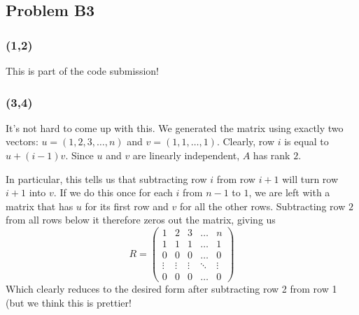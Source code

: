 \documentclass{article}
\begin{document}
\subsection{Problem B3}
\subsubsection{(1,2)} This is part of the code submission!
\subsubsection{(3,4)}
It's not hard to come up with this. We generated the matrix using exactly two vectors:
$u = (1,2,3,\dots,n)$ and $v = (1,1,\dots,1)$. Clearly, row $i$ is equal to $u + (i-1)v$.
Since $u$ and $v$ are linearly independent, $A$ has rank $2$.

In particular, this tells us that subtracting row $i$ from row $i+1$ will turn row $i+1$ into $v$.
If we do this once for each $i$ from $n-1$ to $1$, we are left with a matrix that has $u$
for its first row and $v$ for all the other rows.
Subtracting row $2$ from all rows below it therefore zeros out the matrix, giving us
\[
R = \left(
\begin{array}{ccccc}
1 & 2 & 3 & \dots & n\\
1 & 1 & 1 & \dots & 1\\
0 & 0 & 0 & \dots & 0\\
\vdots & \vdots & \vdots & \ddots & \vdots\\
0 & 0 & 0 & \dots & 0
\end{array}
\right)
\]
Which clearly reduces to the desired form after subtracting row 2 from row 1 (but we think this is prettier!
\end{document}
